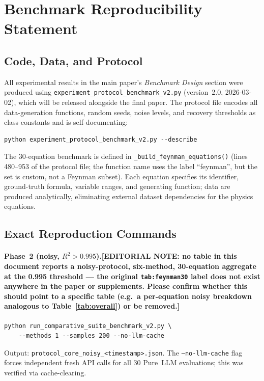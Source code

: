 \documentclass[twoside,11pt]{article}
\begin{document}
\section{Benchmark Reproducibility Statement}
\label{app:repro_statement}

\subsection*{Code, Data, and Protocol}

All experimental results in the main paper's \emph{Benchmark Design} section were produced
using \texttt{experiment\_protocol\_benchmark\_v2.py} (version~2.0,
2026-03-02), which will be released alongside the final paper.
The protocol file encodes all data-generation functions, random seeds, noise
levels, and recovery thresholds as class constants and is self-documenting:

\begin{verbatim}
python experiment_protocol_benchmark_v2.py --describe
\end{verbatim}

\noindent The 30-equation benchmark is defined in
\texttt{\_build\_feynman\_equations()} (lines 480--953 of the protocol file; the
function name uses the label ``feynman'', but the set is custom, not a Feynman subset).
Each equation specifies its identifier, ground-truth formula, variable
ranges, and generating function; data are produced analytically, eliminating
external dataset dependencies for the physics equations.

\subsection*{Exact Reproduction Commands}

\paragraph{Phase~2 (noisy, $R^2>0.995$).\textbf{[EDITORIAL NOTE: no table in this
document reports a noisy-protocol, six-method, 30-equation aggregate at the
0.995 threshold --- the original \texttt{tab:feynman30} label does not exist
anywhere in the paper or supplements. Please confirm whether this should
point to a specific table (e.g.\ a per-equation noisy breakdown analogous to
Table~\ref{tab:overall}) or be removed.]}}
\begin{verbatim}
python run_comparative_suite_benchmark_v2.py \
    --methods 1 --samples 200 --no-llm-cache
\end{verbatim}
Output: \texttt{protocol\_core\_noisy\_<timestamp>.json}.
The \texttt{--no-llm-cache} flag forces independent fresh API calls for all
30 Pure~LLM evaluations; this was verified via cache-clearing.
\end{document}
